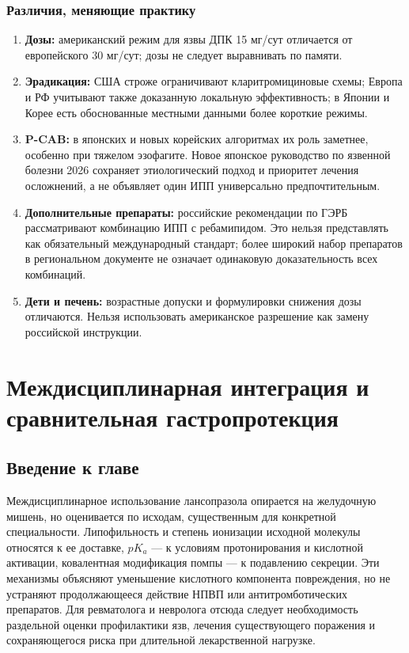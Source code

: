 \documentclass[11pt,a4paper,notitlepage]{report}
\newcommand{\src}[1]{\unskip\space\cite{#1}}
\begin{document}
\subsection{Различия, меняющие практику}
\begin{enumerate}
\item \textbf{Дозы:} американский режим для язвы ДПК 15 мг/сут отличается от европейского 30 мг/сут; дозы не следует выравнивать по памяти.\src{uslabel,hpra}
\item \textbf{Эрадикация:} США строже ограничивают кларитромициновые схемы; Европа и РФ учитывают также доказанную локальную эффективность; в Японии и Корее есть обоснованные местными данными более короткие режимы.\src{acghp,maastricht,rfpud,jhp,khp}
\item \textbf{P-CAB:} в японских и новых корейских алгоритмах их роль заметнее, особенно при тяжелом эзофагите. Новое японское руководство по язвенной болезни 2026 сохраняет этиологический подход и приоритет лечения осложнений, а не объявляет один ИПП универсально предпочтительным.\src{jgerd,seoul,jpud2026}
\item \textbf{Дополнительные препараты:} российские рекомендации по ГЭРБ рассматривают комбинацию ИПП с ребамипидом. Это нельзя представлять как обязательный международный стандарт; более широкий набор препаратов в региональном документе не означает одинаковую доказательность всех комбинаций.\src{rfgerd,acggerd}
\item \textbf{Дети и печень:} возрастные допуски и формулировки снижения дозы отличаются. Нельзя использовать американское разрешение как замену российской инструкции.\src{uslabel,emc,grls}
\end{enumerate}

\chapter{Междисциплинарная интеграция и сравнительная гастропротекция}
\label{chap:interdisciplinary}

\section*{Введение к главе}
Междисциплинарное использование лансопразола опирается на желудочную мишень, но оценивается по исходам, существенным для конкретной специальности. Липофильность и степень ионизации исходной молекулы относятся к ее доставке, $pK_a$ --- к условиям протонирования и кислотной активации, ковалентная модификация помпы --- к подавлению секреции. Эти механизмы объясняют уменьшение кислотного компонента повреждения, но не устраняют продолжающееся действие НПВП или антитромботических препаратов. Для ревматолога и невролога отсюда следует необходимость раздельной оценки профилактики язв, лечения существующего поражения и сохраняющегося риска при длительной лекарственной нагрузке.\src{molchem,molnagaya90,molcys,nice,aspirintrial,nsaid15}
\end{document}
